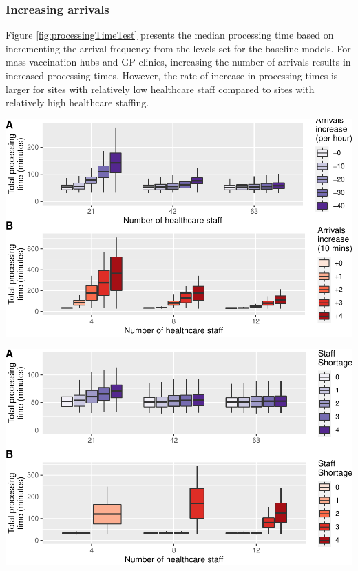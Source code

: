 \documentclass{article}
\let\origfigure\figure
\let\endorigfigure\endfigure
\renewenvironment{figure}[1][2] {
    \expandafter\origfigure\expandafter[H]
} {
    \endorigfigure
}
\begin{document}
\hypertarget{increasing-arrivals}{%
\subsubsection{Increasing arrivals}\label{increasing-arrivals}}

Figure \ref{fig:processingTimeTest} presents the median processing time
based on incrementing the arrival frequency from the levels set for the
baseline models. For mass vaccination hubs and GP clinics, increasing
the number of arrivals results in increased processing times. However,
the rate of increase in processing times is larger for sites with
relatively low healthcare staff compared to sites with relatively high
healthcare staffing.

\begin{figure}

{\centering \includegraphics{Preprint_files/figure-latex/processingTimeTest-1} 

}

\caption{Increase in processing time with increased arrivals by site size for mass vaccination hubs (A) and GP vaccination clinics (B)}\label{fig:processingTimeTest}
\end{figure}

\begin{figure}

{\centering \includegraphics{Preprint_files/figure-latex/staffShortageTest-1} 

}

\caption{Increase in processing time with staff shortages by site size}\label{fig:staffShortageTest}
\end{figure}
\end{document}
